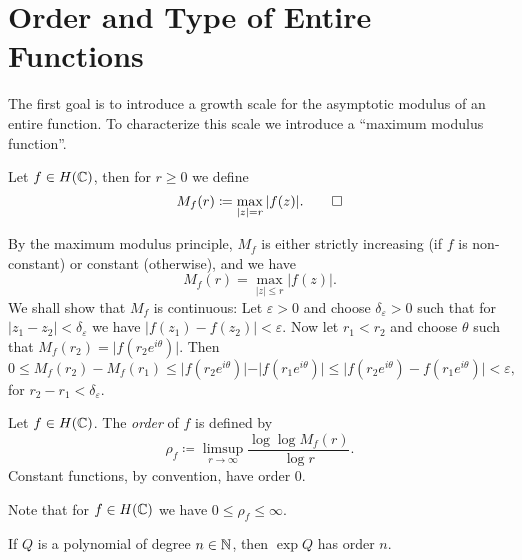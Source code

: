 \section{Order and Type of Entire Functions} \label{sec:order-type}

The first goal is to introduce a growth scale for the asymptotic modulus of an entire function. To characterize this scale we introduce a ``maximum modulus function''.

\begin{definition}
    Let $f \in H(\mathbb{C})$, then for $r \geq 0$ we define
    \begin{equation*}
        M_f(r) \coloneqq \max_{\vert z \vert = r} \vert f(z) \vert. \qedhere
    \end{equation*}
\end{definition}

\begin{remark}    
    By the maximum modulus principle, $M_f$ is either strictly increasing (if $f$ is non-constant) or constant (otherwise), and we have
    $$ M_f(r) = \max_{\vert z \vert \leq r} \vert f(z) \vert. $$
    We shall show that $M_f$ is continuous: Let $\varepsilon > 0$ and choose $\delta_\varepsilon > 0$ such that for ${\vert z_1 - z_2 \vert < \delta_\varepsilon}$ we have ${\vert f(z_1) - f(z_2) \vert < \varepsilon}$. Now let $r_1 < r_2$ and choose $\theta$ such that $M_f(r_2) = \vert f(r_2 e^{i \theta}) \vert$. Then
    \begin{equation*}
        0 \leq M_f(r_2) - M_f(r_1) \leq \vert f(r_2 e^{i \theta}) \vert - \vert f(r_1 e^{i \theta}) \vert \leq \vert f(r_2 e^{i \theta}) - f(r_1 e^{i \theta}) \vert < \varepsilon,
    \end{equation*}
    for $r_2 - r_1 < \delta_\varepsilon$.
\end{remark}

\begin{definition} \label{def:order}
    Let $f \in H(\mathbb{C})$. The \emph{order} of $f$ is defined by
    \begin{equation} \label{eq:def-order}
        \rho_f \coloneqq \limsup_{r \to \infty} \frac{\log \log M_f(r)}{\log r}.
    \end{equation}
    Constant functions, by convention, have order 0.
\end{definition}

Note that for $f \in H(\mathbb{C})$ we have $0 \leq \rho_f \leq \infty$.

\begin{proposition} \label{prop:order-exponential-polynomial}
    If $Q$ is a polynomial of degree $n \in \mathbb{N}$, then $\exp Q$ has order $n$.
\end{proposition}

